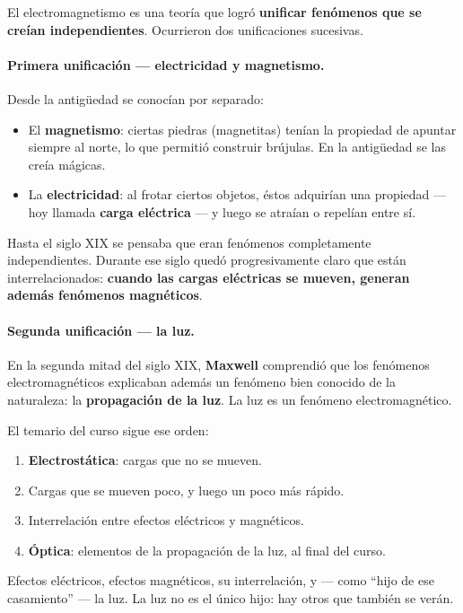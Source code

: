 \documentclass[12pt,a4paper]{article}
\begin{document}
El electromagnetismo es una teoría que logró \textbf{unificar fenómenos que se
creían independientes}. Ocurrieron dos unificaciones sucesivas.

\paragraph{Primera unificación --- electricidad y magnetismo.}
Desde la antigüedad se conocían por separado:

\begin{itemize}
  \item El \textbf{magnetismo}: ciertas piedras (magnetitas) tenían la propiedad
        de apuntar siempre al norte, lo que permitió construir brújulas. En la
        antigüedad se las creía mágicas.
  \item La \textbf{electricidad}: al frotar ciertos objetos, éstos adquirían una
        propiedad --- hoy llamada \textbf{carga eléctrica} --- y luego se atraían
        o repelían entre sí.
\end{itemize}

Hasta el siglo XIX se pensaba que eran fenómenos completamente independientes.
Durante ese siglo quedó progresivamente claro que están interrelacionados:
\textbf{cuando las cargas eléctricas se mueven, generan además fenómenos
magnéticos}.

\paragraph{Segunda unificación --- la luz.}
En la segunda mitad del siglo XIX, \textbf{Maxwell} comprendió que los fenómenos
electromagnéticos explicaban además un fenómeno bien conocido de la naturaleza:
la \textbf{propagación de la luz}. La luz es un fenómeno electromagnético.

El temario del curso sigue ese orden:

\begin{enumerate}
  \item \textbf{Electrostática}: cargas que no se mueven.
  \item Cargas que se mueven poco, y luego un poco más rápido.
  \item Interrelación entre efectos eléctricos y magnéticos.
  \item \textbf{Óptica}: elementos de la propagación de la luz, al final del
        curso.
\end{enumerate}

\begin{notebox}
Efectos eléctricos, efectos magnéticos, su interrelación, y --- como
\enquote{hijo de ese casamiento} --- la luz. La luz no es el único hijo: hay
otros que también se verán.
\end{notebox}
\end{document}
